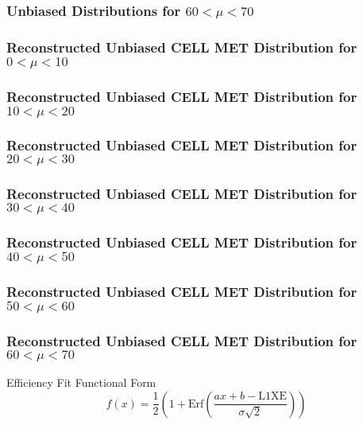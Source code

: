 \documentclass[draft]{beamer}
\begin{document}
\begin{frame}
        \frametitle{Unbiased Distributions for $60<\mu<70$}
\end{frame}
\begin{frame}
        \frametitle{Reconstructed Unbiased CELL MET Distribution for $0<\mu<10$}
\end{frame}
\begin{frame}
        \frametitle{Reconstructed Unbiased CELL MET Distribution for $10<\mu<20$}
\end{frame}
\begin{frame}
        \frametitle{Reconstructed Unbiased CELL MET Distribution for $20<\mu<30$}
\end{frame}
\begin{frame}
        \frametitle{Reconstructed Unbiased CELL MET Distribution for $30<\mu<40$}
\end{frame}
\begin{frame}
        \frametitle{Reconstructed Unbiased CELL MET Distribution for $40<\mu<50$}
\end{frame}
\begin{frame}
        \frametitle{Reconstructed Unbiased CELL MET Distribution for $50<\mu<60$}
\end{frame}
\begin{frame}
        \frametitle{Reconstructed Unbiased CELL MET Distribution for $60<\mu<70$}
\end{frame}
\begin{frame}{Efficiency Fit Functional Form}
        $$f(x)=\frac{1}{2}\left( 1+\mathrm{Erf}\left( \frac{ax+b-\mathrm{L1XE}}{\sigma \sqrt{2}} \right) \right)$$
\end{frame}
\end{document}
